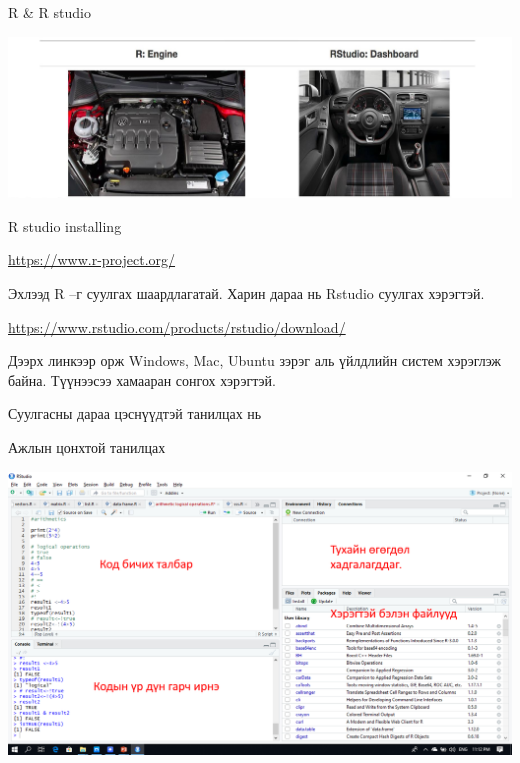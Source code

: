 \documentclass[
  ignorenonframetext,
]{beamer}
\begin{document}
\begin{frame}{R \& R studio}
\protect\hypertarget{r-r-studio}{}

\includegraphics[width=1000px]{Picture7}

\end{frame}

\begin{frame}{R studio installing}
\protect\hypertarget{r-studio-installing}{}

\url{https://www.r-project.org/}

Эхлээд R --г суулгах шаардлагатай. Харин дараа нь Rstudio суулгах
хэрэгтэй.

\url{https://www.rstudio.com/products/rstudio/download/}

Дээрх линкээр орж Windows, Mac, Ubuntu зэрэг аль үйлдлийн систем
хэрэглэж байна. Түүнээсээ хамааран сонгох хэрэгтэй.

Суулгасны дараа цэснүүдтэй танилцах нь

\end{frame}

\begin{frame}{Ажлын цонхтой танилцах}
\protect\hypertarget{ux430ux436ux43bux44bux43d-ux446ux43eux43dux445ux442ux43eux439-ux442ux430ux43dux438ux43bux446ux430ux445}{}

\includegraphics[width=900px]{Picture8}

\end{frame}
\end{document}

